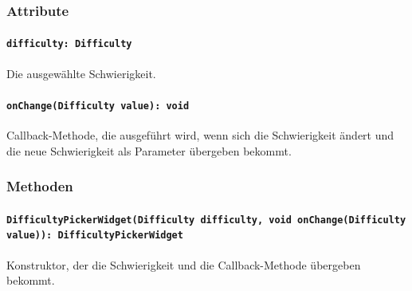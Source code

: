 \documentclass{entwurfsheft}
\begin{document}
\begin{sloppypar}
\subsubsection*{Attribute}
\paragraph{\texttt{difficulty: Difficulty}}
Die ausgewählte Schwierigkeit.
\paragraph{\texttt{onChange(Difficulty value): void}}
Callback-Methode, die ausgeführt wird, wenn sich die Schwierigkeit ändert und die neue Schwierigkeit als Parameter übergeben bekommt.
\subsubsection*{Methoden}
\paragraph{\texttt{DifficultyPickerWidget(Difficulty difficulty, void onChange(Difficulty value)): DifficultyPickerWidget}}
Konstruktor, der die Schwierigkeit und die Callback-Methode übergeben bekommt.
\newpage

\end{sloppypar}
\end{document}
